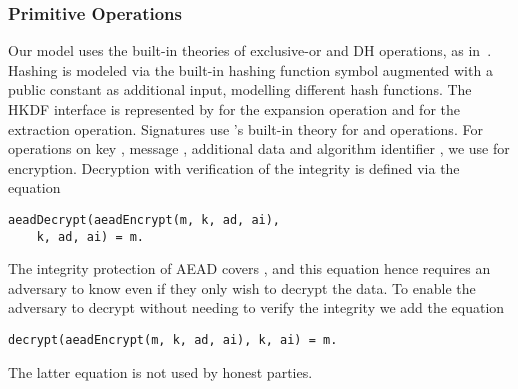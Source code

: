 \subsubsection{Primitive Operations}
Our model uses the built-in theories of exclusive-or and DH operations, as
in~\cite{DBLP:conf/csfw/DreierHRS18,DBLP:conf/csfw/SchmidtMCB12}.
%
Hashing is modeled via the built-in hashing function symbol augmented
with a public constant as additional input, modelling different
hash functions.
%
The HKDF interface is represented by  for the
expansion operation and  for the extraction operation.
%
Signatures use \mTamarin's built-in theory for  and 
operations.
%
For \mAead{} operations on key , message \mbox{}, additional data 
and algorithm identifier , we use 
for encryption.
%
Decryption with verification of the integrity is defined via the equation
\begin{small}\begin{verbatim}
aeadDecrypt(aeadEncrypt(m, k, ad, ai),
    k, ad, ai) = m.
\end{verbatim}\end{small}
%
The integrity protection of AEAD covers , and this equation hence requires
an adversary to know  even if they only wish to decrypt the data.
%
To enable the adversary to decrypt without needing to verify the integrity
we add the equation
\begin{small}\begin{verbatim}
decrypt(aeadEncrypt(m, k, ad, ai), k, ai) = m.
\end{verbatim}\end{small}
%
The latter equation is not used by honest parties.
%

